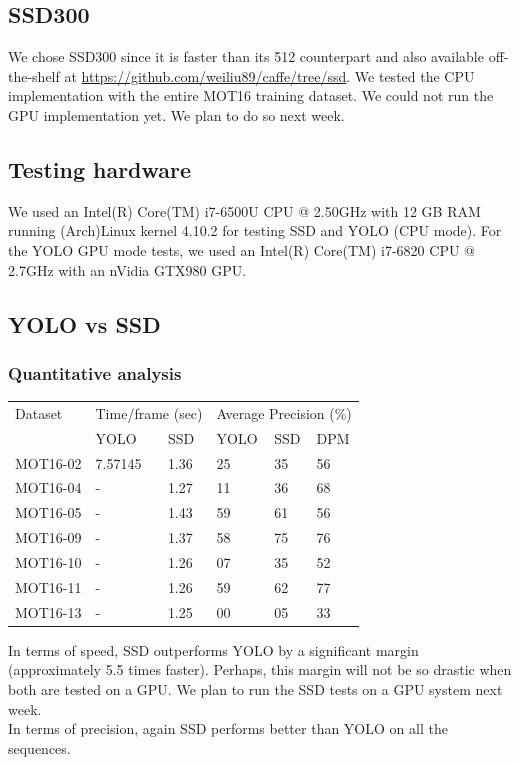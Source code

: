 \documentclass[10pt,twocolumn,letterpaper]{article}
\begin{document}
\subsection{SSD300}
We chose SSD300 since it is faster than its 512 counterpart and also available off-the-shelf at \url{https://github.com/weiliu89/caffe/tree/ssd}.
We tested the CPU implementation with the entire MOT16 training dataset. We could not run the GPU implementation yet. We plan to do so next week.

\subsection{Testing hardware}
We used an Intel(R) Core(TM) i7-6500U CPU @ 2.50GHz with 12 GB RAM running (Arch)Linux kernel 4.10.2 for testing SSD and YOLO (CPU mode). For the YOLO GPU mode tests, we used an Intel(R) Core(TM) i7-6820 CPU @ 2.7GHz with an nVidia GTX980 GPU.

\subsection{YOLO vs SSD}
\subsubsection*{Quantitative analysis}
\begin{center}
    \begin{tabular}{ | l | l | l | l | l | l |}
    \hline
    Dataset & \multicolumn{2}{|c|}{Time/frame (sec)} & \multicolumn{3}{|c|}{Average Precision (\%)}\\
    \cline{2-6}
     & YOLO & SSD & YOLO & SSD & DPM\\
    \hline
    MOT16-02 & 7.57145 & 1.36 & 25 & 35 & 56\\
    MOT16-04 & - & 1.27 & 11 & 36 & 68\\
    MOT16-05 & - & 1.43 & 59 & 61 & 56\\
    MOT16-09 & - & 1.37 & 58 & 75 & 76\\
    MOT16-10 & - & 1.26 & 07 & 35 & 52\\
    MOT16-11 & - & 1.26 & 59 & 62 & 77\\
    MOT16-13 & - & 1.25 & 00 & 05 & 33\\
    \hline
    \end{tabular}
\end{center}
In terms of speed, SSD outperforms YOLO by a significant margin (approximately 5.5 times faster). Perhaps, this margin will not be so drastic when both are tested on a GPU. We plan to run the SSD tests on a GPU system next week.\\
In terms of precision, again SSD performs better than YOLO on all the sequences.
\end{document}
